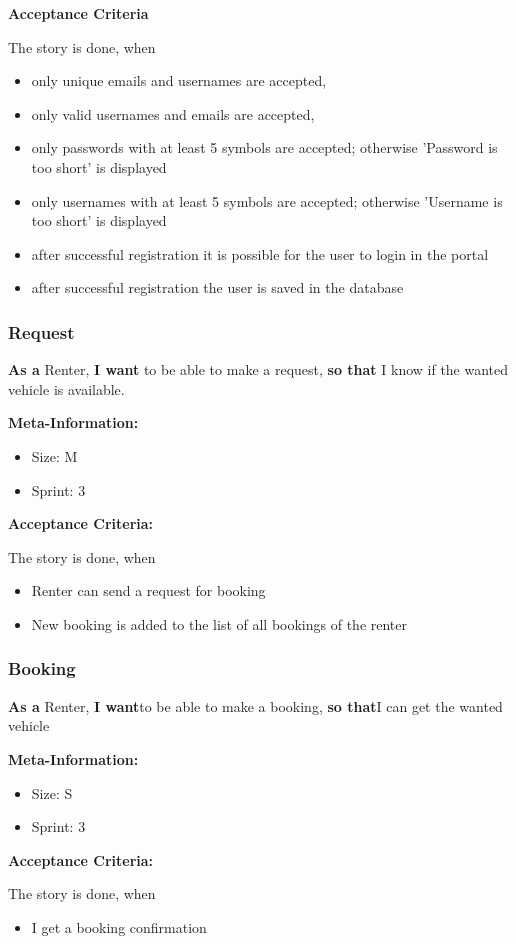 \textbf{Acceptance Criteria}

The story is done, when
\begin{itemize}
    \item only unique emails and usernames are accepted,
    \item only valid usernames and emails are accepted,
    \item only passwords with at least 5 symbols are accepted; otherwise 'Password is too short' is displayed
    \item only usernames with at least 5 symbols are accepted; otherwise 'Username is too short' is displayed
    \item after successful registration it is possible for the user to login in the portal
    \item after successful registration the user is saved in the database
\end{itemize}


\subsubsection{Request}

\textbf{As a} Renter,\hfill\break
\textbf{I want} to be able to make a request,\hfill\break
\textbf{so that} I know if the wanted vehicle is available.

\textbf{Meta-Information:}
\begin{itemize}
    \item Size: M
    \item Sprint: 3
\end{itemize}

\textbf{Acceptance Criteria:}

The story is done, when
\begin{itemize}
    \item Renter can send a request for booking
    \item New booking is added to the list of all bookings of the renter
\end{itemize}

\subsubsection{Booking}

\textbf{As a} Renter,\hfill\break
\textbf{I want}to be able to make a booking,\hfill\break
\textbf{so that}I can get the wanted vehicle

\textbf{Meta-Information:}
\begin{itemize}
    \item Size: S
    \item Sprint: 3
\end{itemize}

\textbf{Acceptance Criteria:}

The story is done, when
\begin{itemize}
    \item I get a booking confirmation
\end{itemize}